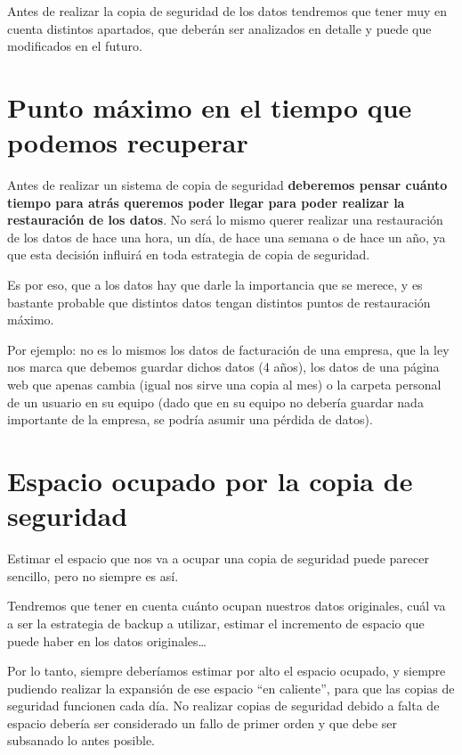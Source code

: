 Antes de realizar la copia de seguridad de los datos tendremos que tener muy en cuenta distintos apartados, que deberán ser analizados en detalle y puede que modificados en el futuro.



\section{Punto máximo en el tiempo que podemos recuperar}
Antes de realizar un sistema de copia de seguridad \textbf{deberemos pensar cuánto tiempo para atrás queremos poder llegar para poder realizar la restauración de los datos}. No será lo mismo querer realizar una restauración de los datos de hace una hora, un día, de hace una semana o de hace un año, ya que esta decisión influirá en toda estrategia de copia de seguridad.

Es por eso, que a los datos hay que darle la importancia que se merece, y es bastante probable que distintos datos tengan distintos puntos de restauración máximo.

Por ejemplo: no es lo mismos los datos de facturación de una empresa, que la ley nos marca que debemos guardar dichos datos (4 años), los datos de una página web que apenas cambia (igual nos sirve una copia al  mes) o la carpeta personal de un usuario en su equipo (dado que en su equipo no debería guardar nada importante de la empresa, se podría asumir una pérdida de datos).


\section{Espacio ocupado por la copia de seguridad}
Estimar el espacio que nos va a ocupar una copia de seguridad puede parecer sencillo, pero no siempre es así.

Tendremos que tener en cuenta cuánto ocupan nuestros datos originales, cuál va a ser la estrategia de backup a utilizar, estimar el incremento de espacio que puede haber en los datos originales…

Por lo tanto, siempre deberíamos estimar por alto el espacio ocupado, y siempre pudiendo realizar la expansión de ese espacio “en caliente”, para que las copias de seguridad funcionen cada día. No realizar copias de seguridad debido a falta de espacio debería ser considerado un fallo de primer orden y que debe ser subsanado lo antes posible.

